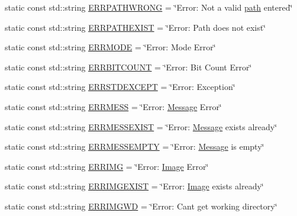 \begin{DoxyCompactItemize}
\item 
static const std\+::string \mbox{\hyperlink{classErrorHandler_aaab6de85cae710a56ae6324b06a42179}{E\+R\+R\+P\+A\+T\+H\+W\+R\+O\+NG}} = \char`\"{}Error\+: Not a valid \mbox{\hyperlink{classErrorHandler_aeabbc987b7eaa01b6d006b55b4e00574}{path}} entered\char`\"{}
\item 
static const std\+::string \mbox{\hyperlink{classErrorHandler_a18de05a2e4538d1417f22b02bbb763bf}{E\+R\+R\+P\+A\+T\+H\+E\+X\+I\+ST}} = \char`\"{}Error\+: Path does not exist\char`\"{}
\item 
static const std\+::string \mbox{\hyperlink{classErrorHandler_a88183b288608b1f8c54c84a27d5f6a40}{E\+R\+R\+M\+O\+DE}} = \char`\"{}Error\+: Mode Error\char`\"{}
\item 
static const std\+::string \mbox{\hyperlink{classErrorHandler_aaca2b9c33a1ad2bcc5d311cb4e5ca8f8}{E\+R\+R\+B\+I\+T\+C\+O\+U\+NT}} = \char`\"{}Error\+: Bit Count Error\char`\"{}
\item 
static const std\+::string \mbox{\hyperlink{classErrorHandler_ae554a9167e1821ba8b49fc3e0bad3288}{E\+R\+R\+S\+T\+D\+E\+X\+C\+E\+PT}} = \char`\"{}Error\+: Exception\char`\"{}
\item 
static const std\+::string \mbox{\hyperlink{classErrorHandler_a921789ddcecc00b88f61b58d8adeae3e}{E\+R\+R\+M\+E\+SS}} = \char`\"{}Error\+: \mbox{\hyperlink{classMessage}{Message}} Error\char`\"{}
\item 
static const std\+::string \mbox{\hyperlink{classErrorHandler_a8abcac399b5014dad5f8d728298489e3}{E\+R\+R\+M\+E\+S\+S\+E\+X\+I\+ST}} = \char`\"{}Error\+: \mbox{\hyperlink{classMessage}{Message}} exists already\char`\"{}
\item 
static const std\+::string \mbox{\hyperlink{classErrorHandler_a28d8ef2ee23112d4895dd60788c1b152}{E\+R\+R\+M\+E\+S\+S\+E\+M\+P\+TY}} = \char`\"{}Error\+: \mbox{\hyperlink{classMessage}{Message}} is empty\char`\"{}
\item 
static const std\+::string \mbox{\hyperlink{classErrorHandler_a0e6e270374c8c2d2bf1cf3525e2b185b}{E\+R\+R\+I\+MG}} = \char`\"{}Error\+: \mbox{\hyperlink{classImage}{Image}} Error\char`\"{}
\item 
static const std\+::string \mbox{\hyperlink{classErrorHandler_a32d9d3b8749844fa07ce891edea63286}{E\+R\+R\+I\+M\+G\+E\+X\+I\+ST}} = \char`\"{}Error\+: \mbox{\hyperlink{classImage}{Image}} exists already\char`\"{}
\item 
static const std\+::string \mbox{\hyperlink{classErrorHandler_adf275e9080935450d46748424c788efa}{E\+R\+R\+I\+M\+G\+WD}} = \char`\"{}Error\+: Can\textquotesingle{}t get working directory\char`\"{}

\end{DoxyCompactItemize}

